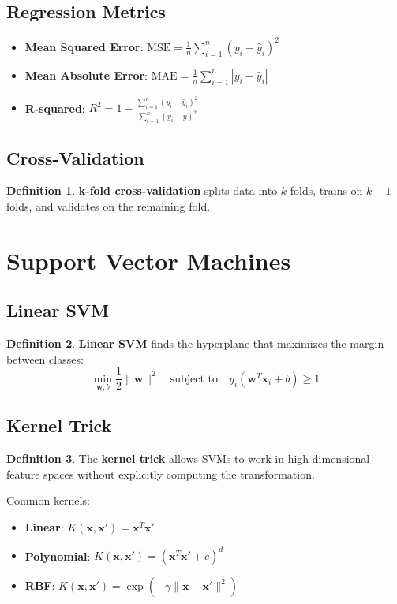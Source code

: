 \documentclass[11pt]{article}
\theoremstyle{definition}
\newtheorem{definition}{Definition}[section]
\begin{document}
\subsection{Regression Metrics}
\begin{itemize}
    \item \textbf{Mean Squared Error}: $\text{MSE} = \frac{1}{n}\sum_{i=1}^n (y_i - \hat{y}_i)^2$
    \item \textbf{Mean Absolute Error}: $\text{MAE} = \frac{1}{n}\sum_{i=1}^n |y_i - \hat{y}_i|$
    \item \textbf{R-squared}: $R^2 = 1 - \frac{\sum_{i=1}^n (y_i - \hat{y}_i)^2}{\sum_{i=1}^n (y_i - \bar{y})^2}$
\end{itemize}

\subsection{Cross-Validation}
\begin{definition}
\textbf{k-fold cross-validation} splits data into $k$ folds, trains on $k-1$ folds, and validates on the remaining fold.
\end{definition}

\section{Support Vector Machines}

\subsection{Linear SVM}
\begin{definition}
\textbf{Linear SVM} finds the hyperplane that maximizes the margin between classes:
$$\min_{\mathbf{w}, b} \frac{1}{2}\|\mathbf{w}\|^2 \quad \text{subject to} \quad y_i(\mathbf{w}^T\mathbf{x}_i + b) \geq 1$$
\end{definition}

\subsection{Kernel Trick}
\begin{definition}
The \textbf{kernel trick} allows SVMs to work in high-dimensional feature spaces without explicitly computing the transformation.
\end{definition}

Common kernels:
\begin{itemize}
    \item \textbf{Linear}: $K(\mathbf{x}, \mathbf{x}') = \mathbf{x}^T\mathbf{x}'$
    \item \textbf{Polynomial}: $K(\mathbf{x}, \mathbf{x}') = (\mathbf{x}^T\mathbf{x}' + c)^d$
    \item \textbf{RBF}: $K(\mathbf{x}, \mathbf{x}') = \exp(-\gamma\|\mathbf{x} - \mathbf{x}'\|^2)$
\end{itemize}
\end{document}
